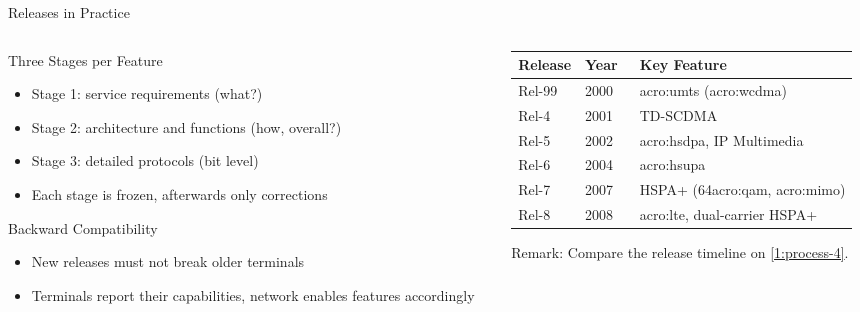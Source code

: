 \begin{frame}{Releases in Practice}
  \begin{columns}[T,onlytextwidth]
    \begin{column}{0.52\textwidth}
      Three Stages per Feature
      \begin{itemize}
        \item Stage 1: service requirements (what?)
        \item Stage 2: architecture and functions (how, overall?)
        \item Stage 3: detailed protocols (bit level)
        \item Each stage is frozen, afterwards only corrections
      \end{itemize}
      \vspace{0.4em}
      Backward Compatibility
      \begin{itemize}
        \item New releases must not break older terminals
        \item Terminals report their capabilities, network enables features accordingly
      \end{itemize}
    \end{column}
    \begin{column}{0.44\textwidth}
      \centering
      \footnotesize
      \begin{tabular}{lll}
        \toprule
        \textbf{Release} & \textbf{Year}~\cite{dahlman-3g} & \textbf{Key Feature} \\
        \midrule
        Rel-99 & 2000 & \acrshort{acro:umts} (\acrshort{acro:wcdma}) \\
        Rel-4 & 2001 & TD-SCDMA \\
        Rel-5 & 2002 & \acrshort{acro:hsdpa}, IP Multimedia \\
        Rel-6 & 2004 & \acrshort{acro:hsupa} \\
        Rel-7 & 2007 & HSPA+ (64\acrshort{acro:qam}, \acrshort{acro:mimo}) \\
        Rel-8 & 2008 & \acrshort{acro:lte}, dual-carrier HSPA+ \\
        \bottomrule
      \end{tabular}

      \normalsize
      \raggedright
      \vspace{0.5em}
      \alert{Remark:} Compare the release timeline on \cref{1:process-4}.
    \end{column}
  \end{columns}
\end{frame}


